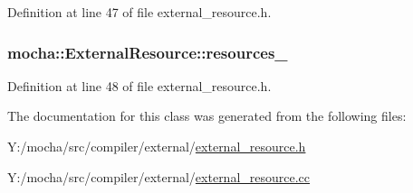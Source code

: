 Definition at line 47 of file external\_\-resource.h.

\hypertarget{classmocha_1_1_external_resource_a31d3e9277c6e9150224e9cc181b042d3}{
\subsubsection[{resources\_\-}]{ {\bf mocha::ExternalResource::resources\_\-}}}
\label{classmocha_1_1_external_resource_a31d3e9277c6e9150224e9cc181b042d3}


Definition at line 48 of file external\_\-resource.h.



The documentation for this class was generated from the following files:\begin{DoxyCompactItemize}
\item 
Y:/mocha/src/compiler/external/\hyperlink{external__resource_8h}{external\_\-resource.h}\item 
Y:/mocha/src/compiler/external/\hyperlink{external__resource_8cc}{external\_\-resource.cc}\end{DoxyCompactItemize}
